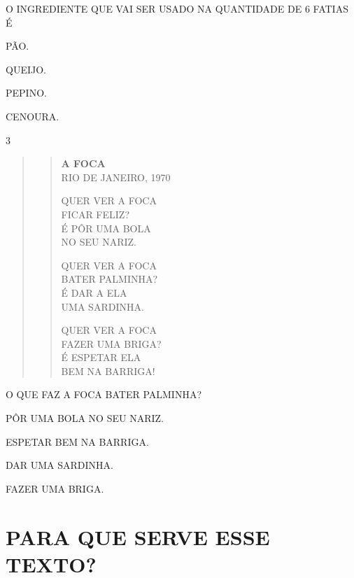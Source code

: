 O INGREDIENTE QUE VAI SER USADO NA QUANTIDADE DE 6 FATIAS É

\begin{escolha}
\item PÃO.

\item QUEIJO.

\item PEPINO.

\item CENOURA.
\end{escolha}

\pagebreak
\num{3}

\begin{quote}
\begin{verse}
\textbf{A FOCA}\\
RIO DE JANEIRO, 1970

QUER VER A FOCA\\
FICAR FELIZ?\\
É PÔR UMA BOLA\\
NO SEU NARIZ.

QUER VER A FOCA\\
BATER PALMINHA?\\
É DAR A ELA\\
UMA SARDINHA.

QUER VER A FOCA\\
FAZER UMA BRIGA?\\
É ESPETAR ELA\\
BEM NA BARRIGA!
\end{verse}

\end{quote}

O QUE FAZ A FOCA BATER PALMINHA?

\begin{escolha}
\item PÔR UMA BOLA NO SEU NARIZ.

\item ESPETAR BEM NA BARRIGA.

\item DAR UMA SARDINHA.

\item FAZER UMA BRIGA.
\end{escolha}

\chapter{PARA QUE SERVE ESSE TEXTO?}

